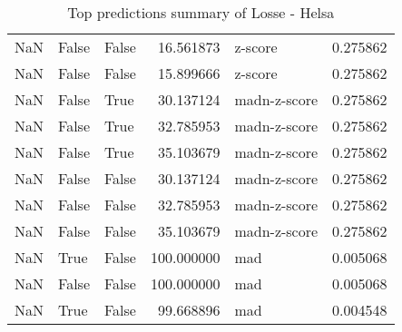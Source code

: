 \begin{table}[htp]
\begin{tabular}{rllrlr}
         NaN &          False &       False &  16.561873 &      z-score &  0.275862 \\
         NaN &          False &       False &  15.899666 &      z-score &  0.275862 \\
         NaN &          False &        True &  30.137124 & madn-z-score &  0.275862 \\
         NaN &          False &        True &  32.785953 & madn-z-score &  0.275862 \\
         NaN &          False &        True &  35.103679 & madn-z-score &  0.275862 \\
         NaN &          False &       False &  30.137124 & madn-z-score &  0.275862 \\
         NaN &          False &       False &  32.785953 & madn-z-score &  0.275862 \\
         NaN &          False &       False &  35.103679 & madn-z-score &  0.275862 \\
         NaN &           True &       False & 100.000000 &          mad &  0.005068 \\
         NaN &          False &       False & 100.000000 &          mad &  0.005068 \\
         NaN &           True &       False &  99.668896 &          mad &  0.004548 \\
\bottomrule
\end{tabular}
\caption{Top predictions summary of Losse - Helsa}
\label{table:42960105-de-top-predictions-summary}
\end{table}
